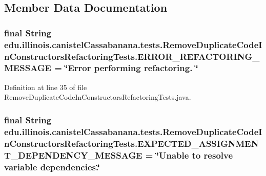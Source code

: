\subsection{Member Data Documentation}
\hypertarget{classedu_1_1illinois_1_1canistelCassabanana_1_1tests_1_1RemoveDuplicateCodeInConstructorsRefactoringTests_a71a84052abdcc1a08c65b55f0a830b7b}{
\subsubsection[{ERROR\_\-REFACTORING\_\-MESSAGE}]{\setlength{\rightskip}{0pt plus 5cm}final String {\bf edu.illinois.canistelCassabanana.tests.RemoveDuplicateCodeInConstructorsRefactoringTests.ERROR\_\-REFACTORING\_\-MESSAGE} = \char`\"{}Error performing refactoring. \char`\"{}}}
\label{classedu_1_1illinois_1_1canistelCassabanana_1_1tests_1_1RemoveDuplicateCodeInConstructorsRefactoringTests_a71a84052abdcc1a08c65b55f0a830b7b}


Definition at line 35 of file RemoveDuplicateCodeInConstructorsRefactoringTests.java.

\hypertarget{classedu_1_1illinois_1_1canistelCassabanana_1_1tests_1_1RemoveDuplicateCodeInConstructorsRefactoringTests_af2137a25d70680689bc1cc93d92106db}{
\subsubsection[{EXPECTED\_\-ASSIGNMENT\_\-DEPENDENCY\_\-MESSAGE}]{\setlength{\rightskip}{0pt plus 5cm}final String {\bf edu.illinois.canistelCassabanana.tests.RemoveDuplicateCodeInConstructorsRefactoringTests.EXPECTED\_\-ASSIGNMENT\_\-DEPENDENCY\_\-MESSAGE} = \char`\"{}Unable to resolve variable dependencies.\char`\"{}}}
\label{classedu_1_1illinois_1_1canistelCassabanana_1_1tests_1_1RemoveDuplicateCodeInConstructorsRefactoringTests_af2137a25d70680689bc1cc93d92106db}


